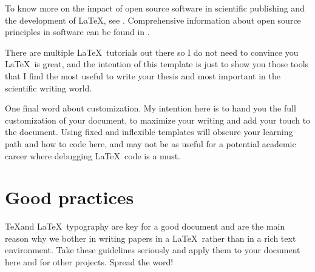 To know more on the impact of open source software in scientific publishing and the development of \LaTeX, see \citet{1984texb.book.....K,1994ldps.book.....L}. Comprehensive information about open source principles in software can be found in \citet{stLaurent2004opensource}.

There are multiple \LaTeX\ tutorials out there so I do not need to convince you \LaTeX\ is great, and the intention of this template is just to show you those tools that I find the most useful to write your thesis and most important in the scientific writing world.

One final word about customization. My intention here is to hand you the full customization of your document, to maximize your writing and add your touch to the document. Using fixed and inflexible templates will obscure your learning path and how to code here, and may not be as useful for a potential academic career where debugging \LaTeX\ code is a must.

\section{Good practices}

\TeX and \LaTeX\ typography are key for a good document and are the main reason why we bother in writing papers in a \LaTeX\ rather than in a rich text environment. Take these guidelines seriously and apply them to your document here and for other projects. Spread the word!

